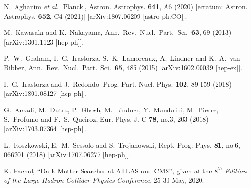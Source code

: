 \documentclass[14pt]{article}
\begin{document}
{%


\begin{thebibliography}{99}


N.~Aghanim \textit{et al.} [Planck],
Astron. Astrophys. \textbf{641}, A6 (2020)
[erratum: Astron. Astrophys. \textbf{652}, C4 (2021)]
[arXiv:1807.06209 [astro-ph.CO]].

  M.~Kawasaki and K.~Nakayama,
  Ann.\ Rev.\ Nucl.\ Part.\ Sci.\  {\bf 63}, 69 (2013)
  [arXiv:1301.1123 [hep-ph]].
 
  P.~W.~Graham, I.~G.~Irastorza, S.~K.~Lamoreaux, A.~Lindner and K.~A.~van Bibber,
  Ann.\ Rev.\ Nucl.\ Part.\ Sci.\  {\bf 65}, 485 (2015)
  [arXiv:1602.00039 [hep-ex]].

I.~G.~Irastorza and J.~Redondo,
Prog. Part. Nucl. Phys. \textbf{102}, 89-159 (2018)
[arXiv:1801.08127 [hep-ph]].

 G.~Arcadi, M.~Dutra, P.~Ghosh, M.~Lindner, Y.~Mambrini, M.~Pierre, S.~Profumo and F.~S.~Queiroz, 
Eur. Phys. J. C \textbf{78}, no.3, 203 (2018)
[arXiv:1703.07364 [hep-ph]].
  
L.~Roszkowski, E.~M.~Sessolo and S.~Trojanowski,
Rept. Prog. Phys. \textbf{81}, no.6, 066201 (2018)
[arXiv:1707.06277 [hep-ph]].
 
  K. Pachal,  ``Dark Matter Searches at ATLAS and CMS'', given at the $8^{th}$ {\it {Edition of the Large Hadron Collider Physics Conference}}, 25-30 May, 2020.
 

\end{thebibliography}}
\end{document}
